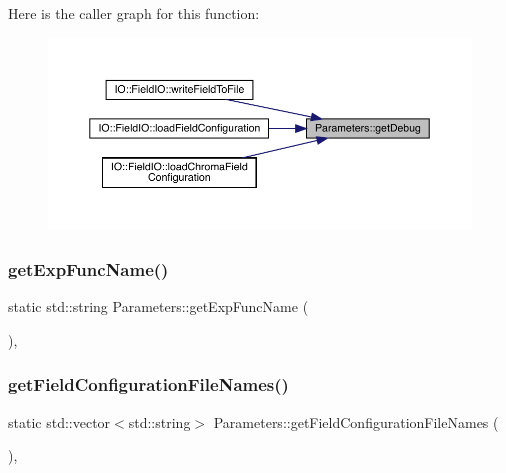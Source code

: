 Here is the caller graph for this function\+:\nopagebreak
\begin{figure}[H]
\begin{center}
\leavevmode
\includegraphics[width=350pt]{class_parameters_a265e274127b6d845e43c66d94463f051_icgraph}
\end{center}
\end{figure}
\mbox{\label{class_parameters_a9fa8d9376dcba8e98b3fff764e1059d7}} 
\subsubsection{\texorpdfstring{getExpFuncName()}{getExpFuncName()}}
{\footnotesize\ttfamily static std\+::string Parameters\+::get\+Exp\+Func\+Name (\begin{DoxyParamCaption}{ }\end{DoxyParamCaption})\hspace{0.3cm}{\ttfamily [inline]}, {\ttfamily [static]}}

\mbox{\label{class_parameters_a3ed137b5c7d4271b470df14ee2557004}} 
\subsubsection{\texorpdfstring{getFieldConfigurationFileNames()}{getFieldConfigurationFileNames()}}
{\footnotesize\ttfamily static std\+::vector$<$std\+::string$>$ Parameters\+::get\+Field\+Configuration\+File\+Names (\begin{DoxyParamCaption}{ }\end{DoxyParamCaption})\hspace{0.3cm}{\ttfamily [inline]}, {\ttfamily [static]}}

